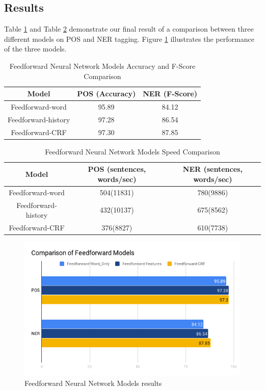 \documentclass{sfuthesis}
\begin{document}
\subsection{Results}
Table \ref{table:ff-table1} and Table \ref{table:ff-tabel2} demonstrate our final result of a comparison between three different models on POS and NER tagging. Figure \ref{fig:ff} illustrates the performance of the three models.

\begin{table}[]
\centering
\caption{Feedforward Neural Network Models Accuracy and F-Score Comparison}
\label{table:ff-table1}
\begin{tabular}{|c|c|c|}
\hline
Model         & POS (Accuracy)  & NER (F-Score)       \\ \hline
Feedforward-word    & 95.89          &   84.12     \\ \hline
Feedforward-history & 97.28     & 86.54        \\ \hline
Feedforward-CRF     & 97.30          &   87.85     \\ \hline
\end{tabular}
\end{table}

\begin{table}[]
\centering
\caption{Feedforward Neural Network Models Speed Comparison}
\label{table:ff-tabel2}
\begin{tabular}{|c|c|c|}
\hline
Model       & POS  (sentences, words/sec)  & NER  (sentences, words/sec)      \\ \hline
Feedforward-word    & 504(11831)     & 780(9886)    \\ \hline
Feedforward-history & 432(10137)     & 675(8562)     \\ \hline
Feedforward-CRF    & 376(8827)     & 610(7738)     \\ \hline
\end{tabular}
\end{table}

\begin{figure}
  \centering
  \includegraphics[scale=0.6]{ff.png}
 \caption{Feedforward Neural Network Models results}
  \label{fig:ff}
\end{figure}
\end{document}
